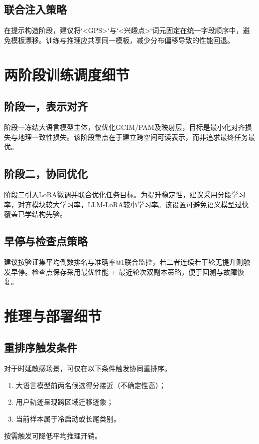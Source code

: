 \subsection{联合注入策略}
在提示构造阶段，建议将`<GPS>`与`<兴趣点>`词元固定在统一字段顺序中，避免模板漂移。训练与推理应共享同一模板，减少分布偏移导致的性能回退。

\section{两阶段训练调度细节}
\subsection{阶段一，表示对齐}
阶段一冻结大语言模型主体，仅优化GCIM/PAM及映射层，目标是最小化对齐损失与地理一致性损失。该阶段重点在于建立跨空间可读表示，而非追求最终任务最优。

\subsection{阶段二，协同优化}
阶段二引入LoRA微调并联合优化任务目标。为提升稳定性，建议采用分段学习率，对齐模块较大学习率，LLM-LoRA较小学习率。该设置可避免语义模型过快覆盖已学结构先验。

\subsection{早停与检查点策略}
建议按验证集平均倒数排名与准确率@1联合监控，若二者连续若干轮无提升则触发早停。检查点保存采用最优性能 + 最近轮次双副本策略，便于回溯与故障恢复。

\section{推理与部署细节}
\subsection{重排序触发条件}
对于时延敏感场景，可仅在以下条件触发协同重排序。
\begin{enumerate}
    \item 大语言模型前两名候选得分接近（不确定性高）；
    \item 用户轨迹呈现跨区域迁移迹象；
    \item 当前样本属于冷启动或长尾类别。
\end{enumerate}
\par\indent 按需触发可降低平均推理开销。

